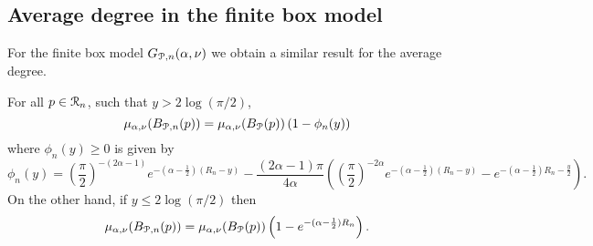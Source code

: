 \subsection{Average degree in the finite box model}\label{ssec:average_degree_P_n}

For the finite box model $G_{{\mathcal P},n}(\alpha, \nu)$ we obtain a similar result for the average degree.

\begin{lemma}\label{lem:average_degree_P_n}
For all $p \in {\mathcal R}_n$, such that $y > 2\log(\pi/2)$,
\[
	\mu_{\alpha,\nu}(B_{{\mathcal P},n}(p)) = \mu_{\alpha,\nu}(B_{{\mathcal P}}(p))\left(1 - \phi_n(y)\right)
\]
where $\phi_n(y) \ge 0$ is given by
\[
	\phi_n(y) = \left(\frac{\pi}{2}\right)^{-(2\alpha - 1)}e^{-(\alpha-\frac{1}{2})(R_n - y)}
	- \frac{(2\alpha - 1)\pi}{4\alpha}\left(\left(\frac{\pi}{2}\right)^{-2\alpha} 
	e^{-(\alpha - \frac{1}{2})(R_n - y)} - e^{-(\alpha - \frac{1}{2})R_n - \frac{y}{2}}\right).
\]
On the other hand, if $y \le 2 \log(\pi/2)$ then
\[
	\mu_{\alpha,\nu}(B_{{\mathcal P},n}(p)) = \mu_{\alpha,\nu}(B_{{\mathcal P}}(p))\left(1 - e^{-(\alpha - \frac{1}{2})R_n}\right).
\]
\end{lemma}

